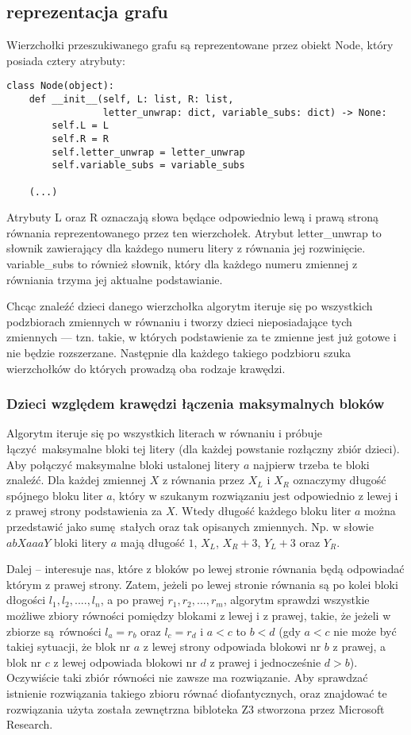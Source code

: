\documentclass[leqno, 12pt]{article}
\begin{document}
\subsection{reprezentacja grafu}
Wierzchołki przeszukiwanego grafu są reprezentowane przez obiekt Node, który posiada cztery atrybuty:
\begin{verbatim}
class Node(object):
    def __init__(self, L: list, R: list, 
                 letter_unwrap: dict, variable_subs: dict) -> None:
        self.L = L
        self.R = R
        self.letter_unwrap = letter_unwrap
        self.variable_subs = variable_subs

    (...)
\end{verbatim}
Atrybuty L oraz R oznaczają słowa będące odpowiednio lewą i prawą stroną równania reprezentowanego przez ten wierzchołek. Atrybut letter\_unwrap to słownik zawierający dla każdego numeru litery z równania jej rozwinięcie. variable\_subs to również słownik, który dla każdego numeru zmiennej z równiania trzyma jej aktualne podstawianie.


Chcąc znaleźć dzieci danego wierzchołka algorytm iteruje się po wszystkich podzbiorach zmiennych w równaniu i tworzy dzieci nieposiadające tych zmiennych --- tzn. takie, w których podstawienie za te zmienne jest już gotowe i nie będzie rozszerzane. Następnie dla każdego takiego podzbioru szuka wierzchołków do których prowadzą oba rodzaje krawędzi.

\subsubsection*{Dzieci względem krawędzi łączenia maksymalnych bloków}
Algorytm iteruje się po wszystkich literach w równaniu i próbuje łączyć maksymalne bloki tej litery (dla każdej powstanie rozłączny zbiór dzieci).
Aby połączyć maksymalne bloki ustalonej litery $a$ najpierw trzeba te bloki znaleźć. Dla każdej zmiennej $X$ z równania przez $X_L$ i $X_R$ oznaczymy długość spójnego bloku liter $a$, który w szukanym rozwiązaniu jest odpowiednio z lewej i z prawej strony podstawienia za $X$. Wtedy długość każdego bloku liter $a$ można przedstawić jako sumę stałych oraz tak opisanych zmiennych. Np. w słowie $abXaaaY$ bloki litery $a$ mają długość $1$, $X_L$, $X_R + 3$, $Y_L + 3$ oraz $Y_R$.

Dalej -- interesuje nas, które z bloków po lewej stronie równania będą odpowiadać którym z prawej strony. Zatem, jeżeli po lewej stronie równania są po kolei bloki dłogości $l_1, l_2, ...., l_n$, a po prawej $r_1, r_2, ..., r_m$, algorytm sprawdzi wszystkie możliwe zbiory równości pomiędzy blokami z lewej i z prawej, takie, że jeżeli w zbiorze są równości $l_a = r_b$ oraz $l_c = r_d$ i $a < c$ to $b < d$ (gdy $a < c$ nie może być takiej sytuacji, że blok nr $a$ z lewej strony odpowiada blokowi nr $b$ z prawej, a blok nr $c$ z lewej odpowiada blokowi nr $d$ z prawej i jednocześnie $d > b$). Oczywiście taki zbiór równości nie zawsze ma rozwiązanie. Aby sprawdzać istnienie rozwiązania takiego zbioru równać diofantycznych, oraz znajdować te rozwiązania użyta została zewnętrzna bibloteka Z3 stworzona przez Microsoft Research.
\end{document}

